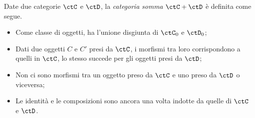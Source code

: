 \begin{definition}\label{def_cat_somma}
	Date due categorie \(\ctC\) e \(\ctD\), la \emph{categoria somma} \(\ctC+\ctD\) è definita come segue.
	\begin{itemize}
		\item Come classe di oggetti,  ha l'unione disgiunta di \(\ctC_0\) e \(\ctD_0\);
		\item Dati due oggetti \(C\) e \(C'\) presi da \(\ctC\), i morfismi tra loro corrispondono a quelli in \(\ctC\), lo stesso succede per gli oggetti presi da \(\ctD\);
		\item Non ci sono morfismi tra un oggetto preso da \(\ctC\) e uno preso da \(\ctD\) o viceversa;
		\item Le identità e le composizioni sono ancora una volta indotte da quelle di \(\ctC\) e \(\ctD\).
	\end{itemize}
\end{definition}



